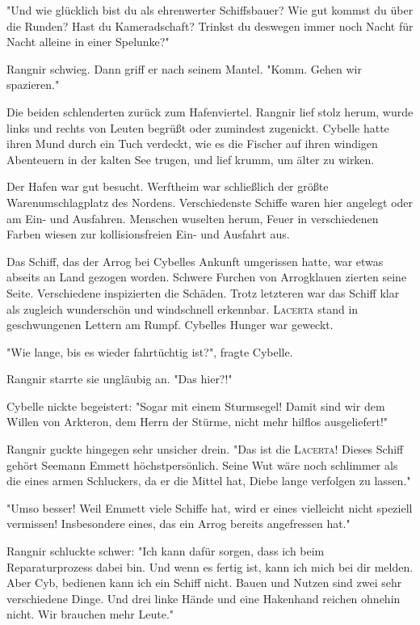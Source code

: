 "Und wie glücklich bist du als ehrenwerter Schiffsbauer? Wie gut kommst du über die Runden? Hast du Kameradschaft? Trinkst du deswegen immer noch Nacht für Nacht alleine in einer Spelunke?"

Rangnir schwieg. Dann griff er nach seinem Mantel. "Komm. Gehen wir spazieren."

Die beiden schlenderten zurück zum Hafenviertel. Rangnir lief stolz herum, wurde links und rechts von Leuten begrüßt oder zumindest zugenickt. Cybelle hatte ihren Mund durch ein Tuch verdeckt, wie es die Fischer auf ihren windigen Abenteuern in der kalten See trugen, und lief krumm, um älter zu wirken.

Der Hafen war gut besucht. Werftheim war schließlich der größte Warenumschlagplatz des Nordens. Verschiedenste Schiffe waren hier angelegt oder am Ein- und Ausfahren. Menschen wuselten herum, Feuer in verschiedenen Farben wiesen zur kollisionsfreien Ein- und Ausfahrt aus. 

Das Schiff, das der Arrog bei Cybelles Ankunft umgerissen hatte, war etwas abseits an Land gezogen worden. Schwere Furchen von Arrogklauen zierten seine Seite. Verschiedene  inspizierten die Schäden. Trotz letzteren war das Schiff klar als zugleich wunderschön und windschnell erkennbar. \textsc{Lacerta} stand in geschwungenen Lettern am Rumpf. Cybelles Hunger war geweckt.

"Wie lange, bis es wieder fahrtüchtig ist?", fragte Cybelle.

Rangnir starrte sie ungläubig an. "Das hier?!"

Cybelle nickte begeistert: "Sogar mit einem Sturmsegel! Damit sind wir dem Willen von Arkteron, dem Herrn der Stürme, nicht mehr hilflos ausgeliefert!"

Rangnir guckte hingegen sehr unsicher drein. "Das ist die \textsc{Lacerta}! Dieses Schiff gehört Seemann Emmett höchstpersönlich. Seine Wut wäre noch schlimmer als die eines armen Schluckers, da er die Mittel hat, Diebe lange verfolgen zu lassen."

"Umso besser! Weil Emmett viele Schiffe hat, wird er eines vielleicht nicht speziell vermissen! Insbesondere eines, das ein Arrog bereits angefressen hat."

Rangnir schluckte schwer: "Ich kann dafür sorgen, dass ich beim Reparaturprozess dabei bin. Und wenn es fertig ist, kann ich mich bei dir melden. Aber Cyb, bedienen kann ich ein Schiff nicht. Bauen und Nutzen sind zwei sehr verschiedene Dinge. Und drei linke Hände und eine Hakenhand reichen ohnehin nicht. Wir brauchen mehr Leute."

